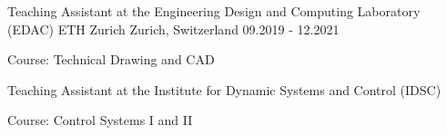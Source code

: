 \begin{cventries}
\cventry
  {Teaching Assistant at the Engineering Design and Computing Laboratory (EDAC)} %
  {ETH Zurich} %
  {Zurich, Switzerland} %
  {09.2019 - 12.2021} %
  {
    \begin{cvitems}
      \item Course: Technical Drawing and CAD
    \end{cvitems}
  }

  \cventry
  {Teaching Assistant at the Institute for Dynamic Systems and Control (IDSC)} %
  {} %
  {} %
  {} %
  {
    \begin{cvitems}
      \item Course: Control Systems I and II
    \end{cvitems}
  }

\end{cventries}
